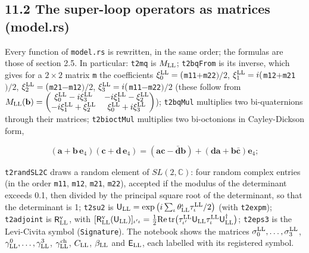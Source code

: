 \documentclass[
  10pt,
]{article}
\begin{document}
\hypertarget{the-super-loop-operators-as-matrices-model.rs}{%
\subsection{11.2 The super-loop operators as matrices
(model.rs)}\label{the-super-loop-operators-as-matrices-model.rs}}

Every function of \texttt{model.rs} is rewritten, in the same order; the
formulas are those of section 2.5. In particular: \texttt{t2mq} is
\(M_{\rm LL}\); \texttt{t2bqFrom} is its inverse, which gives for a
\(2\times2\) matrix \texttt{m} the coefficients
\(\xi^{\rm LL}_0=(\)\texttt{m11}\(+\)\texttt{m22}\()/2\),
\(\xi^{\rm LL}_1=i(\)\texttt{m12}\(+\)\texttt{m21}\()/2\),
\(\xi^{\rm LL}_2=(\)\texttt{m21}\(-\)\texttt{m12}\()/2\),
\(\xi^{\rm LL}_3=i(\)\texttt{m11}\(-\)\texttt{m22}\()/2\) (these follow
from
\(M_{\rm LL}(\mathbf b)=\begin{pmatrix}\xi^{\rm LL}_0-i\xi^{\rm LL}_3&-i\xi^{\rm LL}_1-\xi^{\rm LL}_2\\-i\xi^{\rm LL}_1+\xi^{\rm LL}_2&\xi^{\rm LL}_0+i\xi^{\rm LL}_3\end{pmatrix}\));
\texttt{t2bqMul} multiplies two bi-quaternions through their matrices;
\texttt{t2bioctMul} multiplies two bi-octonions in Cayley-Dickson form,

\[(\mathbf a+\mathbf b\,\mathbf e_4)(\mathbf c+\mathbf d\,\mathbf e_4)=(\mathbf a\mathbf c-\bar{\mathbf d}\mathbf b)+(\mathbf d\mathbf a+\mathbf b\bar{\mathbf c})\mathbf e_4 ;\]

\texttt{t2randSL2C} draws a random element of \(SL(2,\mathbb C)\): four
random complex entries (in the order \texttt{m11}, \texttt{m12},
\texttt{m21}, \texttt{m22}), accepted if the modulus of the determinant
exceeds 0.1, then divided by the principal square root of the
determinant, so that the determinant is 1; \texttt{t2su2} is
\(\mathsf U_{\rm LL}=\exp\big(i\sum_\iota\theta^\iota_{\rm LL}\tau^{\rm LL}_\iota/2\big)\)
(with \texttt{t2expm}); \texttt{t2adjoint} is
\(\mathsf R^{\rm v}_{\rm LL}\), with
\([\mathsf R^{\rm v}_{\rm LL}(\mathsf U_{\rm LL})]_{\iota'\iota}=\tfrac12{\rm Re}\,{\rm tr}\big(\tau^{\rm LL}_{\iota'}\mathsf U_{\rm LL}\tau^{\rm LL}_\iota\mathsf U_{\rm LL}^\dagger\big)\);
\texttt{t2eps3} is the Levi-Civita symbol (\texttt{Signature}). The
notebook shows the matrices
\(\sigma^{\rm LL}_0,\dots,\sigma^{\rm LL}_3\),
\(\gamma^0_{\rm LL},\dots,\gamma^3_{\rm LL}\),
\(\gamma^{\rm ch}_{\rm LL}\), \(C_{\rm LL}\), \(\beta_{\rm LL}\) and
\(\mathsf E_{\rm LL}\), each labelled with its registered symbol.
\end{document}
